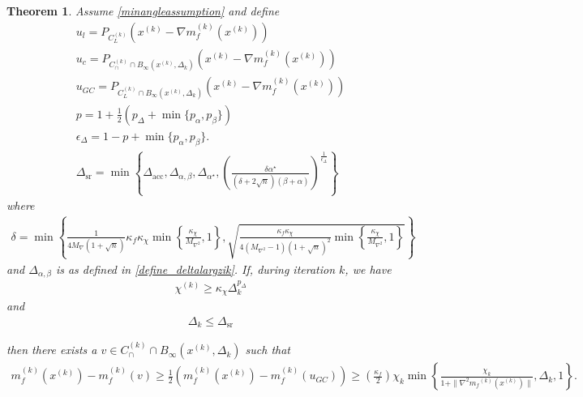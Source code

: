 \documentclass{article}
\newtheorem{theorem}{Theorem}[section]
\theoremstyle{case}
\newcommand{\maxgrad}{{M_{\nabla}}}
\newcommand{\maxhessian}{{M_{\nabla^2}}}
\newcommand{\dacc}{{\Delta_{\text{acc}}}}
\newcommand{\dsr}{{\Delta_{\text{sr}}}}
\newcommand{\xk}{{x^{(k)}}}
\newcommand{\dk}{\Delta_k}
\newcommand{\mfk}{{{m}_f}^{(k)}}
\newcommand{\chik}{{\chi^{(k)}}}
\newcommand{\gk}{{\nabla m_f^{(k)}(x^{(k)})}}
\newcommand{\capcones}{{C^{(k)}_{\cap}}}
\newcommand{\linearization}{{C^{(k)}_{L}}}
\newcommand{\minangledelta}{{\Delta_{\alpha^{\star}}}}
\newcommand{\minanglealpha}{{ \alpha^{\star} }}
\newcommand{\tr}{{ B_{\infty}\left(\xk, \dk\right) }}
\newcommand{\deltalargzik}{{\Delta_{\alpha,\beta}}}
\begin{document}
\begin{theorem}
\label{sufficient_reduction_theorem}
Assume
\cref{minangleassumption}
and define 
\begin{align}
u_l = P_{\linearization}(\xk - \gk) \\
u_c = P_{\capcones\cap\tr}(\xk-\gk) \label{sr_define_u_c} \\
u_{GC} = P_{\linearization\cap\tr}(\xk-\gk) \\
p = 1 + \frac 1 2 \left(p_{\Delta} + \min\{p_{\alpha}, p_{\beta}\}\right) \label{sr_def_p}\\
\epsilon_{\Delta} = 1-p+\min\{p_{\alpha}, p_{\beta}\}. \label{sr_def_epsilon_delta} \\
\dsr = \min\left\{
\dacc,
\deltalargzik,
\minangledelta,
\left(\frac{\delta \minanglealpha}{\left(\delta + 2\sqrt{n}\right)\left(\beta +\alpha\right)}\right)^{\frac 1 {\epsilon_{\Delta}}}
\right\}
\end{align}
where
\begin{align}
\delta = \min\left\{\frac 1 {4\maxgrad(1 + \sqrt{n})} \kappa_f \kappa_{\chi} \min\left\{ \frac{\kappa_{\chi}}{\maxhessian}, 1 \right\}, \sqrt{\frac{\kappa_f \kappa_{\chi}}{4\left(\maxhessian - 1\right)\left(1 + \sqrt{n}\right)^2} \min\left\{ \frac{\kappa_{\chi}}{\maxhessian}, 1 \right\}}\right\} \label{sr_define_delta}
\end{align}
and $\deltalargzik$ is as defined in \cref{define_deltalargzik}.
If, during iteration $k$, we have
\begin{align}
\chik \ge \kappa_{\chi} \dk^{p_{\Delta}} \label{sr_chi_big_enough}
\end{align}
and
\begin{align}
\dk \le \dsr \label{sr_delta_small_enough}
\end{align}

then there exists a $v \in \capcones \cap \tr$ such that
\begin{align*}
m_f^{(k)}(\xk) - m_f^{(k)}(v) \ge \frac 1 2 \left(m_f^{(k)}(\xk) - m_f^{(k)}(u_{GC})\right) \ge \left(\frac{\kappa_f}{2} \right)\chi_k \min\left\{ \frac{\chi_k}{1+\|\nabla^2 \mfk(\xk)\|}, \dk, 1 \right\}.
\end{align*}
\end{theorem}
\end{document}
